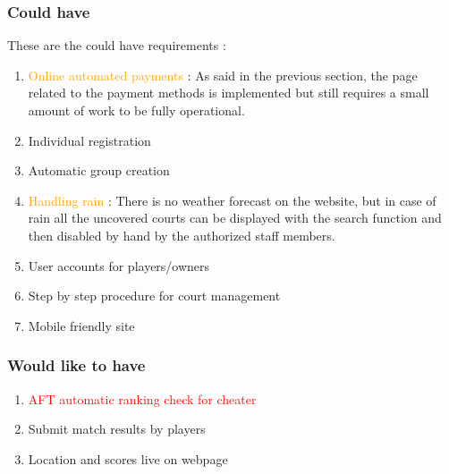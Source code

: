 \subsubsection{Could have}
\label{Could have}

These are the could have requirements :\newline

\begin{enumerate} \itemsep1pt
\item \textcolor{orange} {Online automated payments} : As said in the previous
section, the page related to the payment methods is implemented but still
requires a small amount of work to be fully operational.
\item \textcolor{green!60!black} {Individual registration}
\item \textcolor{green!60!black} {Automatic group creation}
\item \textcolor{orange} {Handling rain} : There is no weather forecast on the
website, but in case of rain all the uncovered courts can be displayed with the
search function and then disabled by hand by the authorized staff members.
\item \textcolor{green!60!black} {User accounts for players/owners}
\item \textcolor{green!60!black} {Step by step procedure for court management}
\item \textcolor{green!60!black} {Mobile friendly site}
\end{enumerate}

\subsubsection{Would like to have}
\label{Would like to have}

\begin{enumerate} \itemsep1pt
\item \textcolor{red} {AFT automatic ranking check for cheater}
\item \textcolor{green!60!black} {Submit match results by players}
\item \textcolor{green!60!black} {Location and scores live on webpage}
\end{enumerate}
